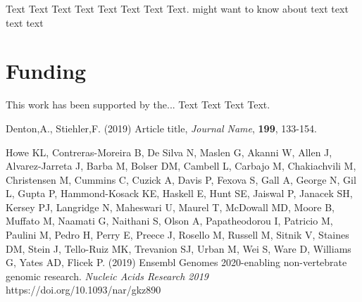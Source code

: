 \documentclass{bioinfo}
\begin{document}
Text Text Text Text Text Text  Text Text.  \citealp{Boffelli03} might want to know about  text
text text text\vspace*{-12pt}

\section*{Funding}

This work has been supported by the... Text Text  Text Text.\vspace*{-12pt}

%
%
%
%
%
%
%
%
%


\begin{thebibliography}{}

Denton,A., Stiehler,F. (2019) Article title, {\it Journal Name}, {\bf 199}, 133-154.

Howe KL, Contreras-Moreira B, De Silva N, Maslen G, Akanni W, Allen J, Alvarez-Jarreta J, Barba M, Bolser DM, Cambell L, Carbajo M, Chakiachvili M, Christensen M, Cummins C, Cuzick A, Davis P, Fexova S, Gall A, George N, Gil L, Gupta P, Hammond-Kosack KE, Haskell E, Hunt SE, Jaiswal P, Janacek SH, Kersey PJ, Langridge N, Maheswari U, Maurel T, McDowall MD, Moore B, Muffato M, Naamati G, Naithani S, Olson A, Papatheodorou I, Patricio M, Paulini M, Pedro H, Perry E, Preece J, Rosello M, Russell M, Sitnik V, Staines DM, Stein J, Tello-Ruiz MK, Trevanion SJ, Urban M, Wei S, Ware D, Williams G, Yates AD, Flicek P. (2019) Ensembl Genomes 2020-enabling non-vertebrate genomic research. {\it Nucleic Acids Research 2019} https://doi.org/10.1093/nar/gkz890

\end{thebibliography}
\end{document}

